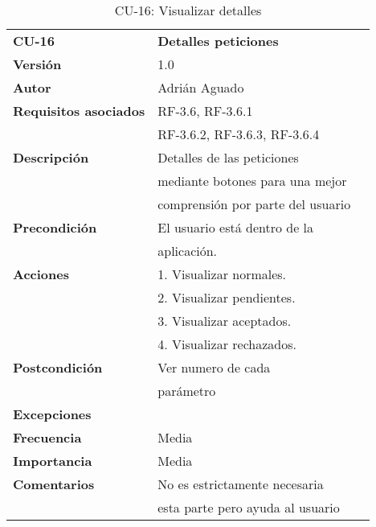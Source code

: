 \begin{table}[H]
\begin{tabular}{llr}  
\toprule
\begin{minipage}[b]{0.24\columnwidth}\raggedright\strut
\textbf{CU-16}\strut
\end{minipage} & \begin{minipage}[b]{0.72\columnwidth}\raggedright\strut
\textbf{Detalles peticiones}\strut
\end{minipage}\tabularnewline
\cmidrule(r){1-2}
\textbf{Versión}       & 1.0           \\
\textbf{Autor}       & Adrián  Aguado    \\
\textbf{Requisitos asociados}       & RF-3.6, RF-3.6.1  \\
& RF-3.6.2, RF-3.6.3, RF-3.6.4   \\
\textbf{Descripción} & Detalles de las peticiones\\
& mediante botones para una mejor \\
& comprensión por parte del usuario\\
\textbf{Precondición}  & El usuario está dentro de la \\
& aplicación.      \\
\textbf{Acciones} & 1. Visualizar normales. \\
& 2. Visualizar pendientes. \\
& 3. Visualizar aceptados. \\
& 4. Visualizar rechazados. \\
\textbf{Postcondición} & Ver numero de cada \\
& parámetro \\
\textbf{Excepciones} &     \\
\textbf{Frecuencia} & Media          \\
\textbf{Importancia} & Media           \\
\textbf{Comentarios } &  No es estrictamente necesaria \\
&  esta parte pero ayuda al usuario \\
\bottomrule
\end{tabular}
\caption{CU-16: Visualizar detalles} 
\end{table}


